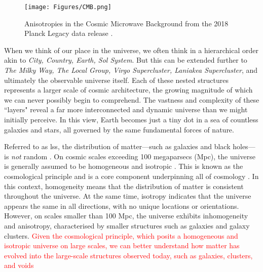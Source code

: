 \begin{figure}
    \centering
    \texttt{[image: Figures/CMB.png]}
    \caption{Anisotropies in the Cosmic Microwave Background from the 2018 Planck Legacy data release \citep{planck_collaboration_planck_2020}.}
    \label{Fig: CMB}
\end{figure}

When we think of our place in the universe, we often think in a hierarchical order akin to \textit{City, Country, Earth, Sol System}. But this can be extended further to \textit{The Milky Way, The Local Group, Virgo Supercluster, Laniakea Supercluster}, and ultimately the observable universe itself. Each of these nested structures represents a larger scale of cosmic architecture, the growing magnitude of which we can never possibly begin to comprehend. The vastness and complexity of these ``layers" reveal a far more interconnected and dynamic universe than we might initially perceive. In this view, Earth becomes just a tiny dot in a sea of countless galaxies and stars, all governed by the same fundamental forces of nature. 

Referred to as \gls{lss}, the distribution of matter---such as galaxies and black holes---is \textit{not} random \citep{bond_how_1996, coil_large-scale_2013}. On cosmic scales exceeding 100 megaparsecs (Mpc), the universe is generally assumed to be homogeneous and isotropic \citep{friedmann_uber_1922, lemaitre_univers_1927, arjona_complementary_2021, dome_cosmic_2023}. This is known as the cosmological principle and is a core component underpinning all of cosmology \citep{yadav_testing_2005, sarkar_scale_2009, planck_collaboration_planck_2016, planck_collaboration_planck_2020-1, planck_collaboration_planck_2020-2}. In this context, homogeneity means that the distribution of matter is consistent throughout the universe. At the same time, isotropy indicates that the universe appears the same in all directions, with no unique locations or orientations. However, on scales smaller than 100 Mpc, the universe exhibits inhomogeneity and anisotropy, characterised by smaller structures such as galaxies and galaxy clusters. \textcolor{red}{Given the cosmological principle, which posits a homogeneous and isotropic universe on large scales, we can better understand how matter has evolved into the large-scale structures observed today, such as galaxies, clusters, and voids}


